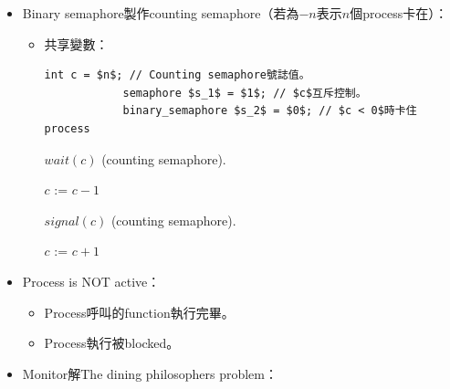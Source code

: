 \begin{itemize}
\begin{itemize}
    \end{itemize}
    \item Binary semaphore製作counting semaphore（若為$-n$表示$n$個process卡在）：\begin{itemize}
        \item 共享變數：\begin{lstlisting}[caption={Shared variables of The dining-philosophers problem.}, captionpos=b, mathescape=true]
            int c = $n$; // Counting semaphore號誌值。
            semaphore $s_1$ = $1$; // $c$互斥控制。
            binary_semaphore $s_2$ = $0$; // $c < 0$時卡住process
        \end{lstlisting}
        \begin{algorithm}[H]
            \caption{$wait(c)$ (counting semaphore).}
            \begin{algorithmic}[1]
                    \State {}
                    \State $c$ := $c - 1$
                        \State {}
                        \State {} 
                    \Else
                        \State {}
                    \EndIf
                \EndFunction
            \end{algorithmic}
        \end{algorithm}
        \begin{algorithm}[H]
            \caption{$signal(c)$ (counting semaphore).}
            \begin{algorithmic}[1]
                    \State {}
                    \State $c$ := $c + 1$
                     
                        \State {}
                    \EndIf
                    \State {}
                \EndFunction
            \end{algorithmic}
        \end{algorithm}
    \end{itemize}
    \item Process is NOT active：\begin{itemize}
        \item Process呼叫的function執行完畢。
        \item Process執行被blocked。
    \end{itemize}
    \item  Monitor解The dining philosophers problem：

\end{itemize}
